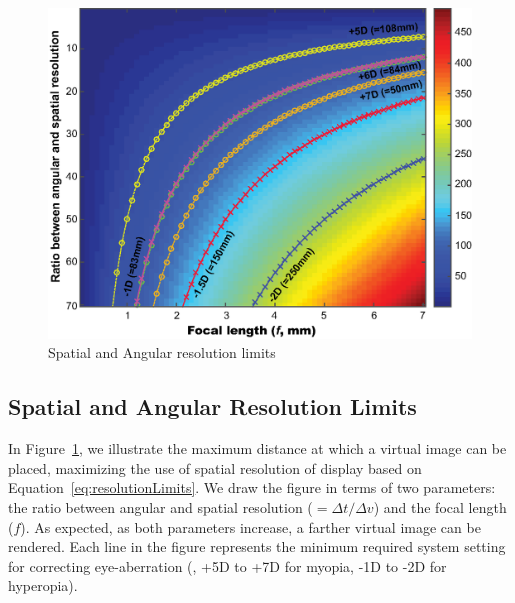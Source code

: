 \begin{figure}
    \begin{center}
    \includegraphics[width=0.95\linewidth]{images/resolutionLimits_v2.eps}
    \end{center}
    \caption{Spatial and Angular resolution limits}
    \label{fig:resolutionLimits}
\end{figure}

\subsection{Spatial and Angular Resolution Limits}
In Figure~\ref{fig:resolutionLimits}, we illustrate the maximum distance at which a virtual image can be placed, maximizing the use of spatial resolution of display based on Equation~\ref{eq:resolutionLimits}. We draw the figure in terms of two parameters: the ratio between angular and spatial resolution ($=\Delta t / \Delta v$) and the focal length ($f$). As expected, as both parameters increase, a farther virtual image can be rendered. Each line in the figure represents the minimum required system setting for correcting eye-aberration (\ie, +5D to +7D for myopia, -1D to -2D for hyperopia).

